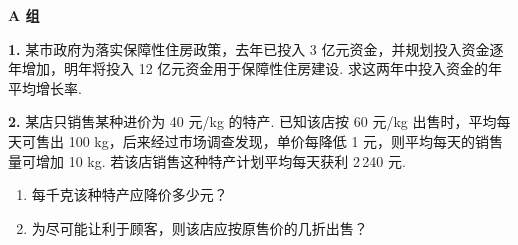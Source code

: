 \documentclass[12pt,a4paper]{ctexart}
\begin{document}


\vspace{0.5cm}

\noindent
{\color{bookblue}\large\textbf{A 组}}

\vspace{0.5cm}

\textbf{1.} 某市政府为落实保障性住房政策，去年已投入 3 亿元资金，并规划投入资金逐年增加，明年将投入 12 亿元资金用于保障性住房建设. 求这两年中投入资金的年平均增长率.

\vspace{0.8cm}

\textbf{2.} 某店只销售某种进价为 40 元/kg 的特产. 已知该店按 60 元/kg 出售时，平均每天可售出 100 kg，后来经过市场调查发现，单价每降低 1 元，则平均每天的销售量可增加 10 kg. 若该店销售这种特产计划平均每天获利 2\,240 元.
\begin{enumerate}[label=(\arabic*), leftmargin=3.5em, itemsep=0.2em]
    \item 每千克该种特产应降价多少元？
    \item 为尽可能让利于顾客，则该店应按原售价的几折出售？
\end{enumerate}

\vspace{0.8cm}
\end{document}
